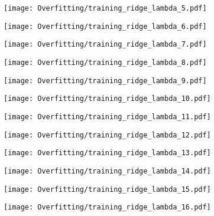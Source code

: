 \documentclass[xcolor=pdftex,dvipsnames,table]{beamer}
\begin{document}
\frame
{
	\begin{center}
		\texttt{[image: Overfitting/training\_ridge\_lambda\_5.pdf]}
	\end{center}
}

\frame
{
	\begin{center}
		\texttt{[image: Overfitting/training\_ridge\_lambda\_6.pdf]}
	\end{center}
}

\frame
{
	\begin{center}
		\texttt{[image: Overfitting/training\_ridge\_lambda\_7.pdf]}
	\end{center}
}

\frame
{
	\begin{center}
		\texttt{[image: Overfitting/training\_ridge\_lambda\_8.pdf]}
	\end{center}
}

\frame
{
	\begin{center}
		\texttt{[image: Overfitting/training\_ridge\_lambda\_9.pdf]}
	\end{center}
}

\frame
{
	\begin{center}
		\texttt{[image: Overfitting/training\_ridge\_lambda\_10.pdf]}
	\end{center}
}

\frame
{
	\begin{center}
		\texttt{[image: Overfitting/training\_ridge\_lambda\_11.pdf]}
	\end{center}
}

\frame
{
	\begin{center}
		\texttt{[image: Overfitting/training\_ridge\_lambda\_12.pdf]}
	\end{center}
}

\frame
{
	\begin{center}
		\texttt{[image: Overfitting/training\_ridge\_lambda\_13.pdf]}
	\end{center}
}

\frame
{
	\begin{center}
		\texttt{[image: Overfitting/training\_ridge\_lambda\_14.pdf]}
	\end{center}
}

\frame
{
	\begin{center}
		\texttt{[image: Overfitting/training\_ridge\_lambda\_15.pdf]}
	\end{center}
}

\frame
{
	\begin{center}
		\texttt{[image: Overfitting/training\_ridge\_lambda\_16.pdf]}
	\end{center}
}
\end{document}
